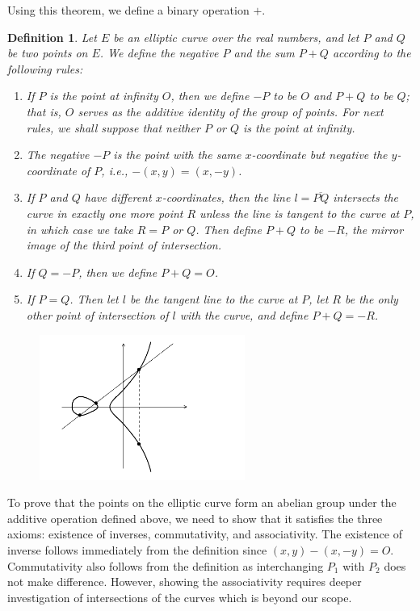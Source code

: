 \documentclass[11pt]{article}
\newtheorem{definition}{Definition}
\begin{document}
Using this theorem, we define a binary operation $+$.
\begin{definition}
Let $E$ be an elliptic curve over the real numbers, and let $P$ and $Q$ be two points on $E$. We define the negative $P$ and the sum $P+Q$ according to the following rules:
\begin{enumerate}
\item If $P$ is the point at infinity $O$, then we define $-P$ to be $O$ and $P+Q$ to be $Q$; that is, $O$ serves as the additive identity of the group of points. For next rules, we shall suppose that neither $P$ or $Q$ is the point at infinity.
\item The negative $-P$ is the point with the same $x$-coordinate but negative the $y$-coordinate of $P$, i.e., $-(x,y) = (x,-y)$. 
\item If $P$ and $Q$ have different $x$-coordinates, then the line $l = \overline{PQ}$ intersects the curve in exactly one more point $R$ unless the line is tangent to the curve at $P$, in which case we take $R=P$ or $Q$. Then define $P+Q$ to be $-R$, the mirror image of the third point of intersection.
\item If $Q = -P$, then we define $P+Q = O$.
\item If $P = Q$. Then let $l$ be the tangent line to the curve at $P$, let $R$ be the only other point of intersection of $l$ with the curve, and define $P+Q=-R$.
\end{enumerate}
\end{definition}

\begin{figure}[t]
\centering
\includegraphics[width=0.6\textwidth]{eca.png}
\end{figure}

To prove that the points on the elliptic curve form an abelian group under the additive operation defined above, we need to show that it satisfies the three axioms: existence of inverses, commutativity, and associativity. The existence of inverse follows immediately from the definition since $(x,y) - (x,-y) = O$. Commutativity also follows from the definition as interchanging $P_1$ with $P_2$ does not make difference. However, showing the associativity requires deeper investigation of intersections of the curves which is beyond our scope.
\end{document}
